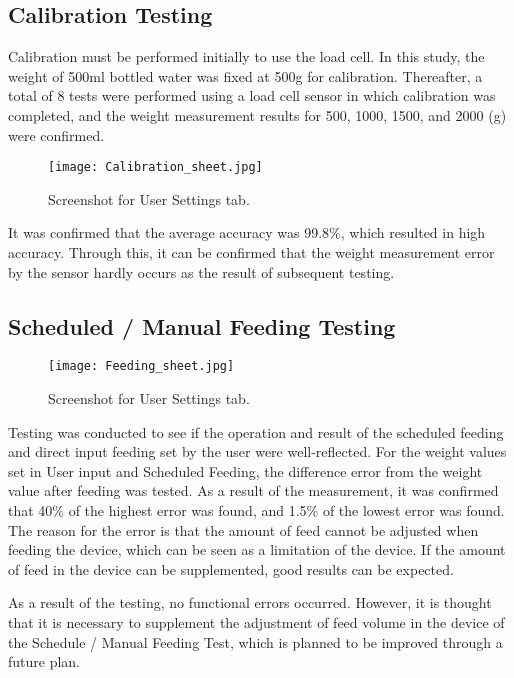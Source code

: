 \documentclass[conference]{IEEEtran}
\begin{document}
\subsection{Calibration Testing}
Calibration must be performed initially to use the load cell. 
In this study, the weight of 500ml bottled water was fixed at 500g for calibration. Thereafter, a total of 8 tests were performed using a load cell sensor in which calibration was completed, and the weight measurement results for 500, 1000, 1500, and 2000 (g) were confirmed.

\begin{figure}[htbp]
\centerline{\texttt{[image: Calibration\_sheet.jpg]}}
\caption{Screenshot for User Settings tab.}
\label{fig}
\end{figure}

It was confirmed that the average accuracy was 99.8\%, which resulted in high accuracy. Through this, it can be confirmed that the weight measurement error by the sensor hardly occurs as the result of subsequent testing.

\subsection{Scheduled / Manual Feeding Testing}

\begin{figure}[htbp]
\centerline{\texttt{[image: Feeding\_sheet.jpg]}}
\caption{Screenshot for User Settings tab.}
\label{fig}
\end{figure}

Testing was conducted to see if the operation and result of the scheduled feeding and direct input feeding set by the user were well-reflected.
For the weight values set in User input and Scheduled Feeding, the difference error from the weight value after feeding was tested.
As a result of the measurement, it was confirmed that 40\% of the highest error was found, and 1.5\% of the lowest error was found.
The reason for the error is that the amount of feed cannot be adjusted when feeding the device, which can be seen as a limitation of the device. If the amount of feed in the device can be supplemented, good results can be expected.

As a result of the testing, no functional errors occurred.
However, it is thought that it is necessary to supplement the adjustment of feed volume in the device of the Schedule / Manual Feeding Test, which is planned to be improved through a future plan.
\end{document}
